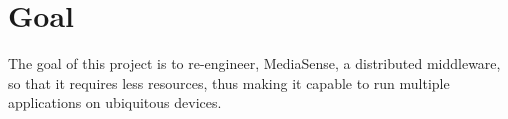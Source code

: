 \section{Goal}
The goal of this project is to re-engineer, MediaSense, a distributed middleware, so that it requires less resources, thus making it capable to run multiple applications on ubiquitous devices. 